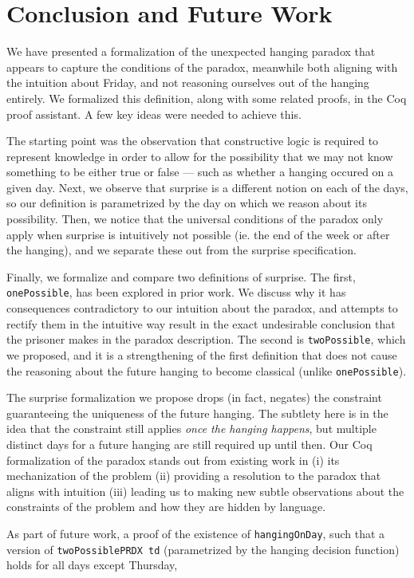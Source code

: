 \documentclass[journal]{journal}
\begin{document}
\section{Conclusion and Future Work}

We have presented a formalization of the unexpected hanging paradox that appears to capture the
conditions of the paradox, meanwhile both aligning with the
intuition about Friday, and not reasoning ourselves out of the hanging entirely.
We formalized this definition, along with some related proofs, in the Coq
proof assistant.
A few key ideas were needed to achieve this.

The starting point was the observation that constructive logic
is required to represent knowledge in order to allow for the possibility that we
may not know something to be either true or false --- such as whether a hanging
occured on a given day. Next, we observe that surprise is a different notion
on each of the days, so our definition is parametrized by the day on which
we reason about its possibility. Then, we notice that the universal conditions of the
paradox only apply when surprise is intuitively not possible (ie. the end of the
week or after the hanging), and we separate these out from the surprise specification.

Finally, we formalize and compare two definitions of surprise. The first,
{\tt onePossible}, has been explored in prior work. We discuss why it has
consequences contradictory to our intuition about the paradox, and attempts to
rectify them in the intuitive way result in the
exact undesirable conclusion that the prisoner makes in the paradox description.
The second is {\tt twoPossible}, which we proposed, and it is a strengthening of
the first definition that does not cause the reasoning about the future hanging to
become classical (unlike {\tt onePossible}).

The surprise formalization we propose drops (in fact, negates) the constraint
guaranteeing the uniqueness of the future hanging. The subtlety here is in the idea that the
constraint still applies \emph{once the hanging happens}, but multiple
distinct days for a future hanging are still required up until then.
Our Coq formalization of the paradox stands out from existing work in (i)
its mechanization of the problem (ii) providing a resolution to the paradox that aligns with
intuition (iii) leading us to making new subtle observations about the
constraints of the problem and how they are hidden by language.

As part of future work, a proof of the existence of {\tt hangingOnDay}, such that
a version of {\tt twoPossiblePRDX td} (parametrized by the hanging decision
function) holds for all days except Thursday,
\end{document}
